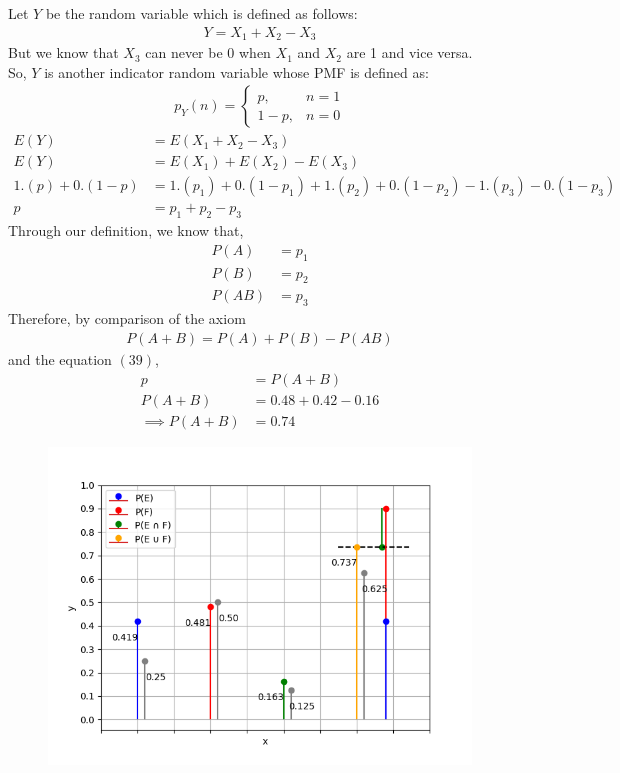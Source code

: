 \documentclass[journal]{IEEEtran}
\begin{document}
Let \(Y\) be the random variable which is defined as follows:
\begin{align}
	Y = X_1 + X_2 - X_3
\end{align}
But we know that \(X_3\) can never be 0 when \(X_1\) and \(X_2\) are 1 and vice versa.\\
So, \(Y\) is another indicator random variable whose PMF is defined as:
\begin{align}
	p_Y(n) =
	\begin{cases}
		p ,& n = 1\\
		1 - p ,& n = 0
	\end{cases}
\end{align}
\begin{align}
	E(Y) &= E(X_1 + X_2 - X_3)\\
	E(Y) &= E(X_1) + E(X_2) - E(X_3)\\
	1.(p) + 0.(1 - p) &= 1.(p_1) + 0.(1 - p_1) + 1.(p_2) + 0.(1 - p_2) - 1.(p_3) - 0.(1 - p_3)\\
	p &= p_1 + p_2 - p_3
\end{align}
Through our definition, we know that,
\begin{align}
	P(A) &= p_1\\
	P(B) &= p_2\\
	P(AB) &= p_3
\end{align}
Therefore, by comparison of the axiom
\begin{align}
	P(A + B) = P(A) + P(B) - P(AB)
\end{align}
and the equation \((39)\),
\begin{align}
	p &= P(A + B)\\
	P(A + B) &= 0.48 + 0.42 - 0.16\\
	\implies P(A + B) &= 0.74
\end{align}
\begin{figure}[h]
\centering
\includegraphics[width=\columnwidth]{figs/Figure_1.png}
\end{figure}
\end{document}

